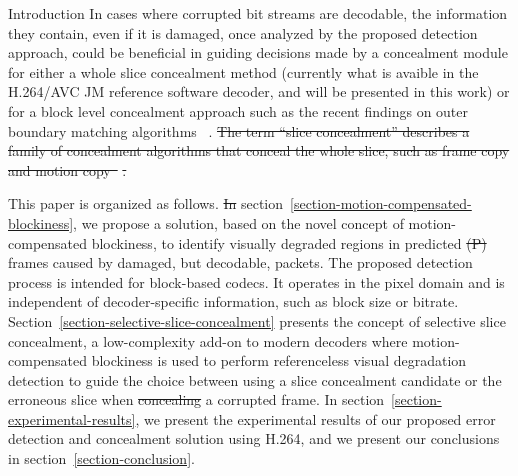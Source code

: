\documentclass{article}
\newcommand{\ltCodec}{H.264/AVC JM reference software}
\providecommand{\DIFaddtex}[1]{{\protect\color{blue}\uwave{#1}}} %
\providecommand{\DIFdeltex}[1]{{\protect\color{red}\sout{#1}}}                      %
\providecommand{\DIFaddbegin}{} %
\providecommand{\DIFaddend}{} %
\providecommand{\DIFdelbegin}{} %
\providecommand{\DIFdelend}{} %
\providecommand{\DIFadd}[1]{\texorpdfstring{\DIFaddtex{#1}}{#1}} %
\providecommand{\DIFdel}[1]{\texorpdfstring{\DIFdeltex{#1}}{}} %
\begin{document}
\begin{section}{Introduction}
In cases where corrupted bit streams are decodable, the information they
contain, even if it is damaged, once analyzed by the proposed detection approach,
could be beneficial in guiding decisions made by a concealment module for either 
a whole slice concealment method (currently what is avaible in the \ltCodec{} decoder, 
and will be presented in this work) or for a block level concealment approach 
such as the recent findings on outer boundary matching algorithms ~\cite{OBMA}.
\DIFdelbegin \DIFdel{The term ``slice concealment'' describes a family of concealment algorithms 
that conceal the whole slice, such as frame copy and motion 
copy~}%
\DIFdel{.
}\DIFdelend 

This paper is organized as follows. \DIFdelbegin \DIFdel{In 
}\DIFdelend \DIFaddbegin \DIFadd{First, in 
}\DIFaddend section~\ref{section-motion-compensated-blockiness}, we propose a solution,
based on the novel concept of motion-compensated blockiness, to identify
visually degraded regions in predicted \DIFdelbegin \DIFdel{(P) }\DIFdelend frames caused by damaged, but decodable,
packets. The proposed detection process is intended for block-based \DIFaddbegin \DIFadd{DCT }\DIFaddend codecs.
It operates in the pixel domain and is independent of decoder-specific
information, such as block size or bitrate. 
Section~\ref{section-selective-slice-concealment} presents the
concept of selective slice concealment, a low-complexity add-on to modern
decoders where motion-compensated blockiness is used to perform referenceless
visual degradation detection to guide the choice between using a slice
concealment candidate or the erroneous slice when \DIFdelbegin \DIFdel{concealing }\DIFdelend \DIFaddbegin \DIFadd{rebuilding }\DIFaddend a corrupted frame.
In section~\ref{section-experimental-results}, we present the experimental 
results of our proposed error detection and concealment solution using H.264, 
and we present our conclusions in section~\ref{section-conclusion}.
\end{section}
\newcommand{\ltSlice}[1]{\mathbf{S}_{#1}}
\newcommand{\ltF}[1]{\mathbf{F}_{#1}}
\newcommand{\ltP}[1]{\mathbf{P}_{#1}}
\newcommand{\ltD}[1]{\mathbf{D}_{#1}}
\newcommand{\ltI}[1]{\mathbf{I}_{#1}}
\newcommand{\ltR}[1]{\mathbf{R}_{#1}}
\newcommand{\ltB}[1]{\mathbf{B}_{#1}}
\newcommand{\ltS}[1]{\mathcal{I}_{#1}}
\newcommand{\ltErr}[1]{\mathbf{\hat{F}}_{#1}}
\newcommand{\ltConc}[1]{\mathbf{F^{\prime}}_{#1}}
\newcommand{\ltOpt}[1]{\mathbf{F^{*}}_{#1}}
\end{document}
